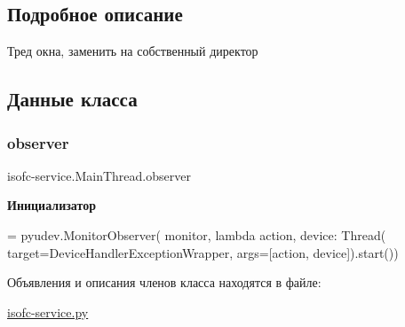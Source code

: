 \subsection{Подробное описание}
Тред окна, заменить на собственный директор 

\subsection{Данные класса}
\mbox{\label{classisofc-service_1_1MainThread_ac4a943d756a48fde83d85217a87e170f}} 
\subsubsection{\texorpdfstring{observer}{observer}}
{\footnotesize\ttfamily isofc-\/service.\+Main\+Thread.\+observer\hspace{0.3cm}{\ttfamily [static]}}

{\bfseries Инициализатор}
\begin{DoxyCode}
=  pyudev.MonitorObserver(
        monitor,
        \textcolor{keyword}{lambda} action, device: Thread(
            target=DeviceHandlerExceptionWrapper,
            args=[action, device]).start())
\end{DoxyCode}


Объявления и описания членов класса находятся в файле\+:\begin{DoxyCompactItemize}
\item 
\mbox{\hyperlink{isofc-service_8py}{isofc-\/service.\+py}}\end{DoxyCompactItemize}
